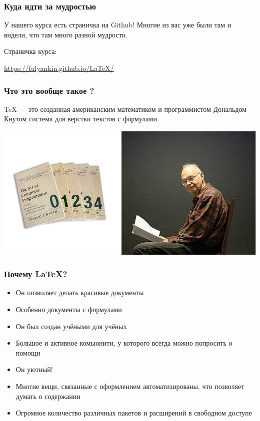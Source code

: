 \documentclass[aspectratio=169,newPxFont]{beamer}
\begin{document}
\begin{frame}
\frametitle{Куда идти за мудростью}

У нашего курса есть страничка на Github! Многие из вас уже были там и видели, что там много разной мудрости.
\vspace{1cm}

\begin{block}{Страничка курса:}
\vspace{3mm}
\centerline {\url{https://fulyankin.github.io/LaTeX/}}
\vspace{3mm}
\end{block}
\end{frame}


\begin{frame}
\frametitle{Что это вообще такое ?}
\alert{TeX} —  это созданная американским математиком и программистом Дональдом Кнутом система для верстки текстов с формулами.

\centering \includegraphics[scale=0.5]{knut.jpg}\\
\end{frame}


\begin{frame}
\frametitle{Почему \LaTeX{}?}
\begin{itemize}
\item Он позволяет делать красивые документы
\item Особенно документы с формулами
\item Он был создан учёными для учёных
\item Большое и активное комьюнити, у которого всегда можно попросить о помощи
\item Он уютный!
\item Многие вещи, связанные с оформлением автоматизированы, что позволяет думать о содержании
\item Огромное количество различных пакетов и расширений в свободном доступе
\end{itemize}
\end{frame}
\end{document}
